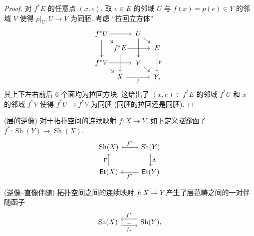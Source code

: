 \begin{proof}
	对 $f^*E$ 的任意点 $(x,e)$, 取 $e\in E$ 的邻域 $U$ 与 $f(x)=p(e)\in Y$ 的邻域 $V$ 使得 $p|_U\colon U \to V$ 为同胚. 考虑 ``拉回立方体''
	\[\begin{tikzcd}[ampersand replacement=\&,sep=tiny]
		{\!\!f^*U\!\!} \&\& {\,U\,} \\
		\& {\!\!f^*E\!\!} \&\& {\,E\,} \\
		{\!\!f^*V\!\!} \&\& {\,V\,} \\
		\& X \&\& {\,Y,\,}
		\arrow[from=1-1, to=1-3]
		\arrow[from=1-1, to=3-1]
		\arrow[from=3-1, to=4-2]
		\arrow["f"', from=4-2, to=4-4]
		\arrow[from=2-2, to=4-2]
		\arrow[from=1-1, to=2-2]
		\arrow[from=2-2, to=2-4]
		\arrow[from=1-3, to=2-4]
		\arrow["p", from=2-4, to=4-4]
		\arrow[from=3-1, to=3-3]
		\arrow[from=3-3, to=4-4]
		\arrow[from=1-3, to=3-3]
	\end{tikzcd}\]
	其上下左右前后 $6$ 个面均为拉回方块. 这给出了 $(x,e)\in f^*E$ 的邻域 $f^*U$ 和 $x$ 的邻域 $f^*V$ 使得 $f^*U \to f^*V$ 为同胚 (同胚的拉回还是同胚).
\end{proof}


\begin{definition}
	{(层的逆像)}
	对于拓扑空间的连续映射 $f\colon X \to Y$, 如下定义\emph{逆像}函子 $f^* \colon \operatorname{Sh}(Y) \to \operatorname{Sh}(X)$.
	\[\begin{tikzcd}[ampersand replacement=\&]
		{\operatorname{Sh}(X)} \& {\operatorname{Sh}(Y)} \\
		{\mathsf{Et}(X)} \& {\mathsf {Et}(Y)}
		\arrow["{f^*}"', from=1-2, to=1-1]
		\arrow["{f^*}", from=2-2, to=2-1]
		\arrow["\Lambda", from=1-2, to=2-2]
		\arrow["\Gamma", from=2-1, to=1-1]
	\end{tikzcd}\]
\end{definition}

\begin{prop}
    [label={inverse-direct-adjoint}]
    {(逆像--直像伴随)}
    拓扑空间之间的连续映射 $f \colon X \to Y$ 产生了层范畴之间的一对伴随函子
    \[\begin{tikzcd}[ampersand replacement=\&]
    	{\operatorname{Sh}(X)} \& {\operatorname{Sh}(Y),}
    	\arrow[""{name=0, anchor=center, inner sep=0}, "{f_*}"', shift right=2, from=1-1, to=1-2]
    	\arrow[""{name=1, anchor=center, inner sep=0}, "{f^*}"', shift right=2, from=1-2, to=1-1]
    	\arrow["\dashv"{anchor=center, rotate=-90}, draw=none, from=1, to=0]
    \end{tikzcd}\]
\end{prop}


